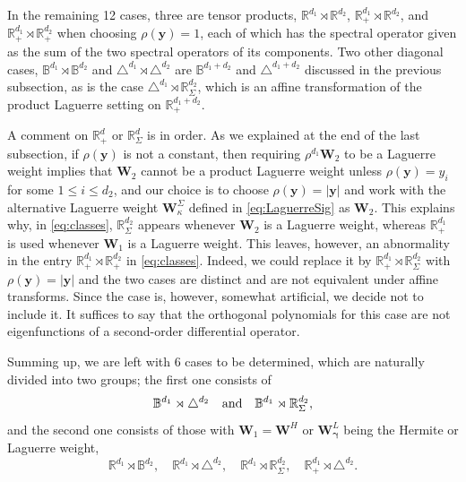 \documentclass{amsart}
\theoremstyle{remark}
\def\k{{\kappa}}
\def\yb{{\bm y}}
\def\Wb{{\bm W}}
\def\BB{{\mathbb B}}
\def\RR{{\mathbb R}}
\def\bg{{\boldsymbol{\gamma}}}
\begin{document}
In the remaining 12 cases, three are tensor products, $\RR^{d_1} \rtimes \RR^{d_2}$, 
$\RR_+^{d_1} \rtimes \RR^{d_2}$, and $ \RR_+^{d_1} \rtimes \RR_+^{d_2}$ when choosing $\rho(\yb) = 1$, 
each of which has the spectral operator given as the sum of the two spectral operators of its components. 
Two other diagonal cases, $\BB^{d_1} \rtimes \BB^{d_2}$ and $ \triangle^{d_1} \rtimes \triangle^{d_2}$
are $\BB^{d_1+d_2}$ and $\triangle^{d_1+d_2}$ discussed in the previous subsection, as is the case 
$\triangle^{d_1} \rtimes \RR_\Sigma^{d_2}$, which is an affine transformation of the product Laguerre 
setting on $\RR_+^{d_1+d_2}$. 

A comment on $\RR_+^d$ or $\RR_\Sigma^d$ is in order. As we explained at the end of the last subsection,
if $\rho(\yb)$ is not a constant, then requiring $\rho^{d_1} \Wb_2$ to be a Laguerre weight implies that 
$\Wb_2$ cannot be a product Laguerre weight unless $\rho(\yb) = y_i$ for some $1\le i \le d_2$, and
our choice is to choose $\rho(\yb) = |\yb|$ and work with the alternative Laguerre weight $\Wb_\k^\Sigma$ 
defined in \eqref{eq:LaguerreSig} as $\Wb_2$. This explains why, in \eqref{eq:classes}, $\RR_\Sigma^{d_2}$ 
appears whenever $\Wb_2$ is a Laguerre weight, whereas $\RR_+^{d_1}$ is used whenever $\Wb_1$ is a 
Laguerre weight. This leaves, however, an abnormality in the entry $\RR_+^{d_1} \rtimes \RR_+^{d_2}$ 
in \eqref{eq:classes}. Indeed, we could replace it by $\RR_+^{d_1} \rtimes \RR_\Sigma^{d_2}$ with 
$\rho(\yb) = |\yb|$ and the two cases are distinct and are not equivalent under affine transforms. Since 
the case is, however, somewhat artificial, we decide not to include it. It suffices to say that the orthogonal
polynomials for this case are not eigenfunctions of a second-order differential operator. 
 
Summing up, we are left with 6 cases to be determined, which are naturally divided into two groups; 
the first one consists of 
 \begin{equation} \label{eq:class1}
  \BB^{d_1} \rtimes \triangle^{d_2} \quad \hbox{and}\quad \BB^{d_1} \rtimes \RR_\Sigma^{d_2},  
 \end{equation}
and the second one consists of those with $\Wb_1 = \Wb^H$ or $\Wb_\bg^L$ being the Hermite or Laguerre weight, 
\begin{equation} \label{eq:class2}
  \RR^{d_1} \rtimes \BB^{d_2},  \quad  \RR^{d_1}\rtimes \triangle^{d_2}, \quad 
      \RR^{d_1} \rtimes \RR_\Sigma^{d_2}, \quad 
 \RR_+^{d_1} \rtimes \triangle^{d_2}. %
\end{equation}
\end{document}
